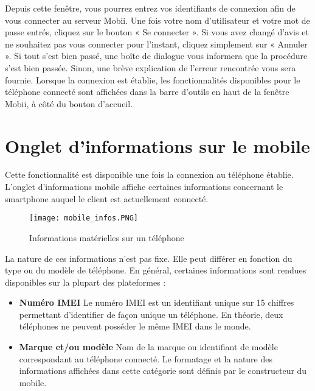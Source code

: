 \documentclass{koala-fr}
\begin{document}
Depuis cette fenêtre, vous pourrez entrez vos identifiants de connexion afin de vous connecter au serveur Mobii.
\newline
\newline
Une fois votre nom d’utilisateur et votre mot de passe entrés, cliquez sur le bouton « Se connecter ».
\newline
\newline
Si vous avez changé d’avis et ne souhaitez pas vous connecter pour l’instant, cliquez simplement sur « Annuler ».
\newline
\newline
Si tout s’est bien passé, une boîte de dialogue vous informera que la procédure s’est bien passée. Sinon, une brève explication de l’erreur rencontrée vous sera fournie.
\newline
\newline
Lorsque la connexion est établie, les fonctionnalités disponibles pour le téléphone connecté sont affichées dans la barre d'outils en haut de la fenêtre Mobii, à côté du bouton d'accueil.

\section{Onglet d'informations sur le mobile}
Cette fonctionnalité est disponible une fois la connexion au téléphone établie.
\newline
\newline
L'onglet d'informations mobile affiche certaines informations concernant le smartphone auquel le client est actuellement connecté.

\begin{figure}[!ht]
  \center
  \texttt{[image: mobile\_infos.PNG]}
  \caption{Informations matérielles sur un téléphone}
\end{figure}

La nature de ces informations n'est pas fixe. Elle peut différer en fonction du type ou du modèle de téléphone. En général, certaines informations sont rendues disponibles sur la plupart des plateformes :

\begin{itemize}
\item\textbf{Numéro IMEI}
\newline
Le numéro IMEI est un identifiant unique sur 15 chiffres permettant d'identifier de façon unique un téléphone. En théorie, deux téléphones ne peuvent posséder le même IMEI dans le monde.
\item\textbf{Marque et/ou modèle}
\newline
Nom de la marque ou identifiant de modèle correspondant au téléphone connecté. Le formatage et la nature des informations affichées dans cette catégorie sont définis par le constructeur du mobile.
\end{itemize}
\end{document}

